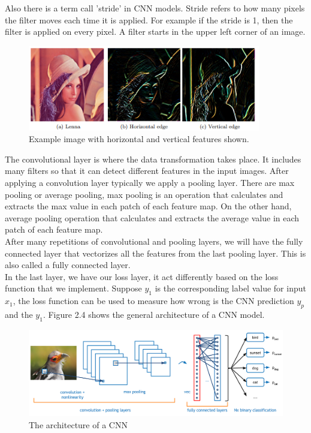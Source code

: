 Also there is a term call 'stride' in CNN models. Stride refers to how many pixels the filter moves each time it is applied. For example if the stride is 1, then the filter is applied on every pixel. A filter starts in the upper left corner of an image. \\
\begin{figure}
  \centering
    \includegraphics[width=4.0in]{figs/cnn_hv_features}
    \caption{Example image with horizontal and vertical features shown.\cite{wu2017introduction}}
\end{figure}
The convolutional layer is where the data transformation takes place. It includes many filters so that it can detect different features in the input images. After applying a convolution layer typically we apply a pooling layer. There are max pooling or average pooling, max pooling is an operation that calculates and extracts the max value in each patch of each feature map. On the other hand, average pooling operation that calculates and extracts the average value in each patch of each feature map\cite{wu2017introduction}.\\
After many repetitions of convolutional and pooling layers, we will have the fully connected layer that vectorizes all the features from the last pooling layer. This is also called a fully connected layer. \\
In the last layer, we have our loss layer, it act differently based on the loss function that we implement. Suppose $y_1$ is the corresponding label value for input $x_1$, the loss function can be used to measure how wrong is the CNN prediction $y_p$ and the $y_1$. Figure 2.4 shows the general architecture of a CNN model.



\begin{figure}
  \centering
    \includegraphics[width=4.5in]{figs/cnn_arch}
    \caption{The architecture of a CNN\cite{cnn}}
\end{figure}

